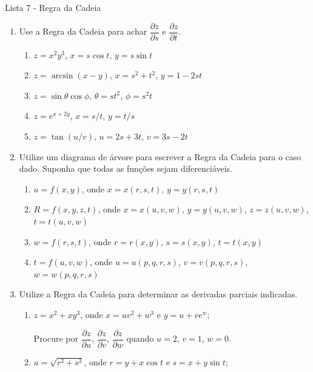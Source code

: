 \documentclass[11pt,a4paper]{article}
\begin{document}
	\begin{center}
		\Large Lista 7 - Regra da Cadeia
	\end{center}
	
	\begin{enumerate}
	
	\item Use a Regra da Cadeia para achar $\dfrac{\partial z}{\partial s}$ e $\dfrac{\partial z}{\partial t}$.
	
	\begin{enumerate}
		\item $z = x^2y^3$, \quad $x = s \cos t$, $y = s \sin t$
		\item $z = \arcsin (x - y)$, \quad $x = s^2 + t^2$, $y = 1 - 2st$
		\item $z = \sin \theta \cos \phi$, \quad $\theta = st^2$, $\phi = s^2t$
		\item $z = e^{x+2y}$, \quad $x = s/t$, $y = t/s$
		\item $z = \tan (u/v)$, \quad $u = 2s + 3t$, $v = 3s - 2t$
	\end{enumerate}
	
	\item Utilize um diagrama de árvore para escrever a Regra da Cadeia para o caso dado. Suponha que todas as funções sejam diferenciáveis.
	\begin{enumerate}
		\item $u = f(x,y)$, onde $x = x(r,s,t)$, $y = y(r,s,t)$
		\item $R = f(x,y,z,t)$, onde $x = x(u,v,w)$, $y = y(u,v,w)$, $z = z(u,v,w)$, $t = t(u,v,w)$
		\item $w = f(r,s,t)$, onde $r = r(x,y)$, $s = s(x,y)$, $t = t(x,y)$
		\item $t = f(u,v,w)$, onde $u = u(p,q,r,s)$, $v = v(p,q,r,s)$, $w = w(p,q,r,s)$
		
	\end{enumerate}
	
	\item Utilize a Regra da Cadeia para determinar as derivadas parciais indicadas.
	\begin{enumerate}
		\item $z = x^2 + xy^3$, onde $x= uv^2 + w^3$ e $y = u + ve^w$; 
		
		Procure por $\dfrac{\partial z}{\partial u}$, $\dfrac{\partial z}{\partial v}$, $\dfrac{\partial z}{\partial w}$ quando $u = 2$, $v = 1$, $w = 0$.
		\item $u = \sqrt{r^2 + s^2}$, onde $r = y + x \cos t$ e $s = x + y \sin t$; 
		

\end{enumerate}
\end{enumerate}
\end{document}
